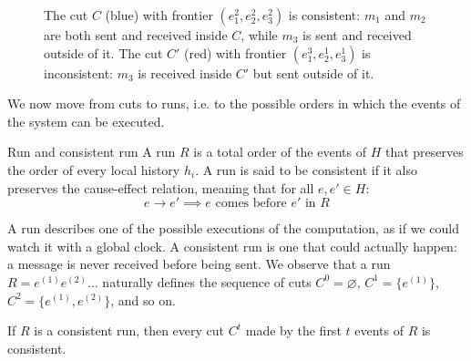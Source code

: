 \begin{figure}[H]
  \centering
  \caption{The cut $C$ (blue) with frontier $(e_1^2, e_2^2, e_3^2)$ is consistent: $m_1$ and $m_2$ are both sent and received inside $C$, while $m_3$ is sent and received outside of it. The cut $C'$ (red) with frontier $(e_1^3, e_2^1, e_3^1)$ is inconsistent: $m_3$ is received inside $C'$ but sent outside of it.}
  \label{fig:cuts}
\end{figure}

We now move from cuts to runs, i.e. to the possible orders in which the events of the system can be executed.

\begin{frameddefn}{Run and consistent run}
  A run $R$ is a total order of the events of $H$ that preserves the order of every local history $h_i$. A run is said to be consistent if it also preserves the cause-effect relation, meaning that for all $e,e' \in H$:
  \[e \to e' \implies e \text{ comes before } e' \text{ in } R\]
\end{frameddefn}

A run describes one of the possible  executions of the computation, as if we could watch it with a global clock. A consistent run is one that could actually happen: a message is never received before being sent. We observe that a run $R = e^{(1)} e^{(2)} \ldots$ naturally defines the sequence of cuts $C^0 = \varnothing$, $C^1 = \{e^{(1)}\}$, $C^2 = \{e^{(1)}, e^{(2)}\}$, and so on.

\begin{framedprop}{}
  If $R$ is a consistent run, then every cut $C^t$ made by the first $t$ events of $R$ is consistent.
\end{framedprop}

